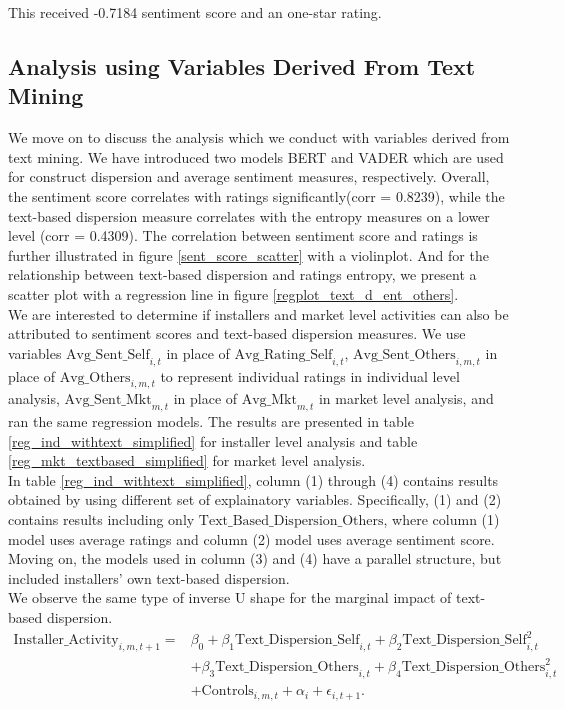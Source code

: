 \documentclass[msom,blindrev]{informs3}
\begin{document}
This received -0.7184 sentiment score and an one-star rating.

\subsection{Analysis using Variables Derived From Text Mining}
We move on to discuss the analysis which we conduct with variables derived from text mining. We have introduced two models BERT and VADER which are used for construct dispersion and average sentiment measures, respectively. Overall, the sentiment score correlates with ratings significantly(corr = 0.8239), while the text-based dispersion measure correlates with the entropy measures on a lower level (corr = 0.4309). The correlation between sentiment score and ratings is further illustrated in figure \ref{sent_score_scatter} with a violinplot. And for the relationship between text-based dispersion and ratings entropy, we present a scatter plot with a regression line in figure \ref{regplot_text_d_ent_others}. \\
We are interested to determine if installers and market level activities can also be attributed to sentiment scores and text-based dispersion measures. We use variables $\text{Avg\_Sent\_Self}_{i,t}$ in place of $\text{Avg\_Rating\_Self}_{i,t}$, $\text{Avg\_Sent\_Others}_{i,m,t}$ in place of $\text{Avg\_Others}_{i,m,t}$ to represent individual ratings in individual level analysis, $\text{Avg\_Sent\_Mkt}_{m,t}$ in place of $\text{Avg\_Mkt}_{m,t}$ in market level analysis, and ran the same regression models. The results are presented in table \ref{reg_ind_withtext_simplified} for installer level analysis and table \ref{reg_mkt_textbased_simplified} for market level analysis.  \\
In table \ref{reg_ind_withtext_simplified}, column (1) through (4) contains results obtained by using different set of explainatory variables. Specifically, (1) and (2) contains results including only $\text{Text\_Based\_Dispersion\_Others}$, where column (1) model uses average ratings and column (2) model uses average sentiment score. Moving on, the models used in column (3) and (4) have a parallel structure, but included installers' own text-based dispersion.  \\

We observe the same type of inverse U shape for the marginal impact of text-based dispersion. \\

\begin{align}  \nonumber
    \text{Installer\_Activity}_{i,m,t+1}=&\beta_{0}+\beta_{1} \text{Text\_Dispersion\_Self}_{i,t}+\beta_{2} \text{Text\_Dispersion\_Self}_{i,t}^ {2}
    \\ \nonumber
    &+\beta_{3} \text{Text\_Dispersion\_Others}_{i,t}  +\beta_{4}\text{Text\_Dispersion\_Others}_{i,t}^{2} \\ \label{model_ind_textbased}
    &+ \text{Controls}_{i,m,t}+ \alpha_{i} + \epsilon_{i,t+1}.
\end{align}
\end{document}
